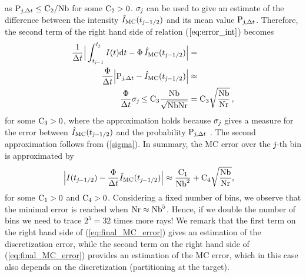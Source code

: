  as $\textrm{P}_{\textit{j}, \Delta t}\leq \textrm{C}_{2}/\textrm{Nb}$ for some $\textrm{C}_{2}>0$. $\sigma_{\textit{j}}$ can be used to give an estimate of the difference between the intensity $\hat{I}_{\textrm{MC}}(t_{\textit{j}-1/2})$ and its mean value $\textrm{P}_{\textit{j}, \Delta t}$.
Therefore, the second term of the right hand side of relation ($\ref{eq:error_int}$) becomes
\begin{equation}\begin{aligned}
\frac{1}{\Delta t}\Big|\int_{t_{\textit{j}-1}}^{t_{\textit{j}}} I(t)\textrm{d}t -
\Phi\, \hat{I}_{\textrm{MC}}(t_{\textit{j}-1/2})\Big| &=  \\
\frac{\Phi}{\Delta t}\Big|\textrm{P}_{\textit{j}, \Delta t} -\hat{I}_{\textrm{MC}}(t_{\textit{j}-1/2})\Big| &\approx  \\
  \frac{\Phi}{\Delta t}
\sigma_{\textit{j}}\leq\textrm{C}_3\frac{\textrm{Nb}}{\sqrt{\textrm{Nb}\textrm{Nr}}} & = \textrm{C}_3\sqrt{\frac{\textrm{Nb}}{\textrm{Nr}}}\,,
\end{aligned}
\end{equation}
for some $\textrm{C}_3>0$, where the approximation holds because $\sigma_{\textit{j}}$ gives a measure for the error between
$\hat{I}_{\textrm{MC}}(t_{\textit{j}-1/2})$ and the probability $\textrm{P}_{\textit{j}, \Delta t}$ \cite{diez2012openintro}. The second approximation follows from (\ref{sigma}). In summary, the MC error over the $\textit{j}$-th bin is approximated by
\begin{equation} \begin{aligned}
\Big|I(t_{\textit{j}-1/2})&-\frac{\Phi}
{\Delta t}\hat{I}_{\textrm{MC}}(t_{\textit{j}-1/2})\Big| \approx
\frac{\textrm{C}_1}{\textrm{Nb}^2} + \textrm{C}_4\sqrt{\frac{\textrm{Nb}}{\textrm{Nr}}},
\end{aligned}
\label{eq:final_MC_error}
\end{equation}
for some $\textrm{C}_1>0$ and $\textrm{C}_4>0$. 
Considering a fixed number of bins, we observe that the minimal error is reached when $\textrm{Nr}\approx \textrm{Nb}^5$.
Hence, if we double the number of bins we need to trace $2^5 = 32$ times more rays!
We remark that the first term on the right hand side of (\ref{eq:final_MC_error}) gives an estimation of the discretization error, while the second term on the right hand side of (\ref{eq:final_MC_error}) provides an estimation of the MC error, which in this case also depends on the discretization (partitioning at the target). 
